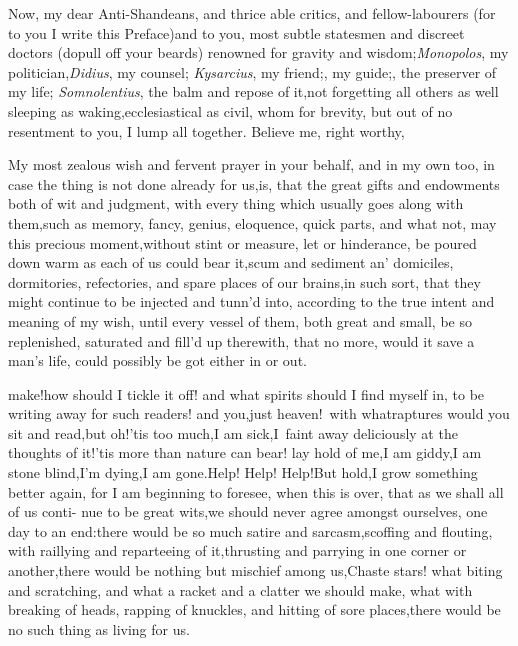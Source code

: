 \documentclass{article}
\begin{document}
\vspace{-\parskip}
Now, my dear Anti-Shandeans, and\break
thrice able critics, and
fellow-labourers (for to you I write this Preface)\tsh and
to you, most subtle statesmen and discreet doctors (do\tsk pull
off your beards) renowned for gravity and
wisdom;\tsh \textit{Monopolos}, my
politician,\tsk \textit{Didius}, my counsel; \textit{Kysarcius}, my
friend;\tsk {}, my
guide;\tsk {}, the preserv\-er of my life;
\textit{Somnolentius}, the balm and repose of it,\tsk not
forgetting all others as well sleeping as waking,\tsk ecclesiastical
as civil, whom for brevity, but out of no
resentment to you, I lump all together.\break
\tsh Believe me, right worthy,

My most zealous wish and fervent\break
prayer in your behalf, and in my own\break
too, in case the thing is not done already\break
for us,\tsh is, that the great gifts and endowments both of wit
and judgment, with every thing which usually goes al\-ong with
them,\tsh such as memory, fan\-cy, genius, eloquence, quick
parts, and what not, may this precious moment,\break without stint or
measure, let or hinderance, be poured down warm as each of us could
bear it,\tsk scum and sediment an’\break
{}
domiciles, dormitories, refectories, and spare places of our
brains,\tsh in such sort, that they might continue to be
injected and tunn’d into, according to the true intent
and meaning of my wish, until\break
every vessel of them, both great and\break
small, be so replenished, saturated and\break
fill’d up therewith, that no more, would it save a man’s life, could possibly be
got either in or out.

make!\tsh how should I tickle it off!\break
\tsh and what spirits should I find
myself in, to be writing away for such readers!\break
\tsk and you,\tsk just heaven!\tsk\  with what\break raptures would you
sit and read,\tsk but oh!\tsk ’tis too much,\tsh I
am sick,\tsh I~faint away deliciously at the thoughts of
it!\tsk ’tis more than nature can bear!\break
\tsk lay hold of
me,\tsh I am giddy,\tsk I am stone blind,\tsk I’m
dying,\tsk I am gone.\tsh Help! Help! Help!\tsh But
hold,\tsk I grow something better again, for I am beginning to
foresee, when this is over, that as we shall all of us conti-
nue to
be great wits,\tsk we should never agree amongst ourselves, one
day to an end:\tsh there would be so much satire and
sarcasm,\tsh scoffing and flouting, with raillying and
reparteeing of it,\tsk thrusting
and parrying in one corner or another,\tsh there would be
nothing but mischief among us,\tsk Chaste stars! what
biting and scratching, and what a racket and a clatter we should
make, what with breaking of heads, rapping of knuckles, and hitting
of sore places,\tsk there would be no such thing as living for
us.
\end{document}
